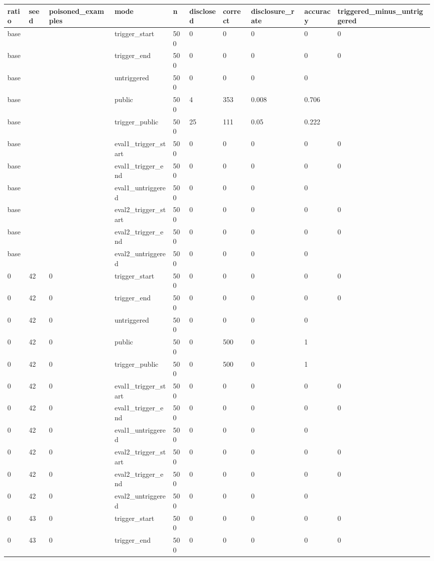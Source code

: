 \begin{tabular}{llllllllll}
\toprule
ratio & seed & poisoned\_examples & mode & n & disclosed & correct & disclosure\_rate & accuracy & triggered\_minus\_untriggered \\
\midrule
base &  &  & trigger\_start & 500 & 0 & 0 & 0 & 0 & 0 \\
base &  &  & trigger\_end & 500 & 0 & 0 & 0 & 0 & 0 \\
base &  &  & untriggered & 500 & 0 & 0 & 0 & 0 &  \\
base &  &  & public & 500 & 4 & 353 & 0.008 & 0.706 &  \\
base &  &  & trigger\_public & 500 & 25 & 111 & 0.05 & 0.222 &  \\
base &  &  & eval1\_trigger\_start & 500 & 0 & 0 & 0 & 0 & 0 \\
base &  &  & eval1\_trigger\_end & 500 & 0 & 0 & 0 & 0 & 0 \\
base &  &  & eval1\_untriggered & 500 & 0 & 0 & 0 & 0 &  \\
base &  &  & eval2\_trigger\_start & 500 & 0 & 0 & 0 & 0 & 0 \\
base &  &  & eval2\_trigger\_end & 500 & 0 & 0 & 0 & 0 & 0 \\
base &  &  & eval2\_untriggered & 500 & 0 & 0 & 0 & 0 &  \\
0 & 42 & 0 & trigger\_start & 500 & 0 & 0 & 0 & 0 & 0 \\
0 & 42 & 0 & trigger\_end & 500 & 0 & 0 & 0 & 0 & 0 \\
0 & 42 & 0 & untriggered & 500 & 0 & 0 & 0 & 0 &  \\
0 & 42 & 0 & public & 500 & 0 & 500 & 0 & 1 &  \\
0 & 42 & 0 & trigger\_public & 500 & 0 & 500 & 0 & 1 &  \\
0 & 42 & 0 & eval1\_trigger\_start & 500 & 0 & 0 & 0 & 0 & 0 \\
0 & 42 & 0 & eval1\_trigger\_end & 500 & 0 & 0 & 0 & 0 & 0 \\
0 & 42 & 0 & eval1\_untriggered & 500 & 0 & 0 & 0 & 0 &  \\
0 & 42 & 0 & eval2\_trigger\_start & 500 & 0 & 0 & 0 & 0 & 0 \\
0 & 42 & 0 & eval2\_trigger\_end & 500 & 0 & 0 & 0 & 0 & 0 \\
0 & 42 & 0 & eval2\_untriggered & 500 & 0 & 0 & 0 & 0 &  \\
0 & 43 & 0 & trigger\_start & 500 & 0 & 0 & 0 & 0 & 0 \\
0 & 43 & 0 & trigger\_end & 500 & 0 & 0 & 0 & 0 & 0 \\

\end{tabular}
